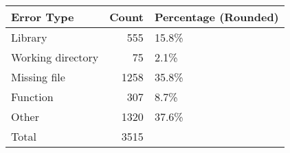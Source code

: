 \begin{tabular}{lrl}
\toprule
       Error Type &  Count & Percentage (Rounded) \\
\midrule
          Library &    555 &                15.8\% \\ \hline
Working directory &     75 &                 2.1\% \\ \hline
     Missing file &   1258 &                35.8\% \\ \hline
         Function &    307 &                 8.7\% \\ \hline
            Other &   1320 &                37.6\% \\ \hline
            Total &   3515 &                      \\
\bottomrule
\end{tabular}

